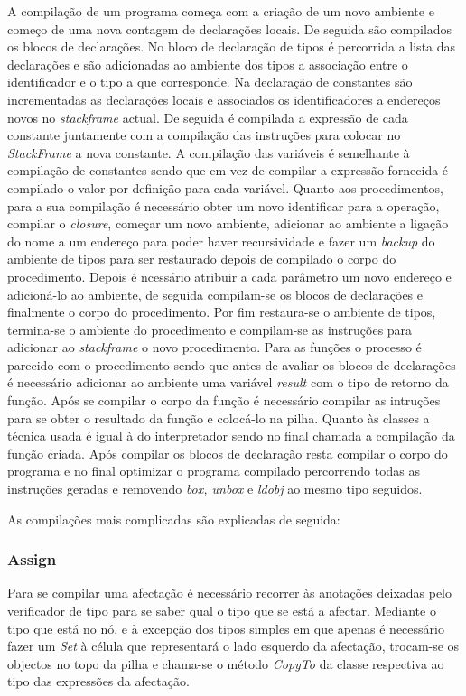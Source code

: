 A compilação de um programa começa com a criação de um novo ambiente e começo de uma nova contagem de declarações locais. De seguida são compilados os blocos de declarações. No bloco de declaração de tipos é percorrida a lista das declarações e são adicionadas ao ambiente dos tipos a associação entre o identificador e o tipo a que corresponde. Na declaração de constantes são incrementadas as declarações locais e associados os identificadores a endereços novos no \emph{stackframe} actual. De seguida é compilada a expressão de cada constante juntamente com a compilação das instruções para colocar no \emph{StackFrame} a nova constante. A compilação das variáveis é semelhante à compilação de constantes sendo que em vez de compilar a expressão fornecida é compilado o valor por definição para cada variável. Quanto aos procedimentos, para a sua compilação é necessário obter um novo identificar para a operação, compilar o \emph{closure}, começar um novo ambiente, adicionar ao ambiente a ligação do nome a um endereço para poder haver recursividade e fazer um \emph{backup} do ambiente de tipos para ser restaurado depois de compilado o corpo do procedimento. Depois é ncessário atribuir a cada parâmetro um novo endereço e adicioná-lo ao ambiente, de seguida compilam-se os blocos de declarações e finalmente o corpo do procedimento. Por fim restaura-se o ambiente de tipos, termina-se o ambiente do procedimento e compilam-se as instruções para adicionar ao \emph{stackframe} o novo procedimento. Para as funções o processo é parecido com o procedimento sendo que antes de avaliar os blocos de declarações é necessário adicionar ao ambiente uma variável \emph{result} com o tipo de retorno da função. Após se compilar o corpo da função é necessário compilar as intruções para se obter o resultado da função e colocá-lo na pilha. Quanto às classes a técnica usada é igual à do interpretador sendo no final chamada a compilação da função criada.
Após compilar os blocos de declaração resta compilar o corpo do programa e no final optimizar o programa compilado percorrendo todas as instruções geradas e removendo \emph{box, unbox} e \emph{ldobj} ao mesmo tipo seguidos.

\newpage
As compilações mais complicadas são explicadas de seguida:

\subsubsection{Assign}

Para se compilar uma afectação é necessário recorrer às anotações deixadas pelo verificador de tipo para se saber qual o tipo que se está a afectar. Mediante o tipo que está no nó, e à excepção dos tipos simples em que apenas é necessário fazer um \emph{Set} à célula que representará o lado esquerdo da afectação, trocam-se os objectos no topo da pilha e chama-se o método \emph{CopyTo} da classe respectiva ao tipo das expressões da afectação.

